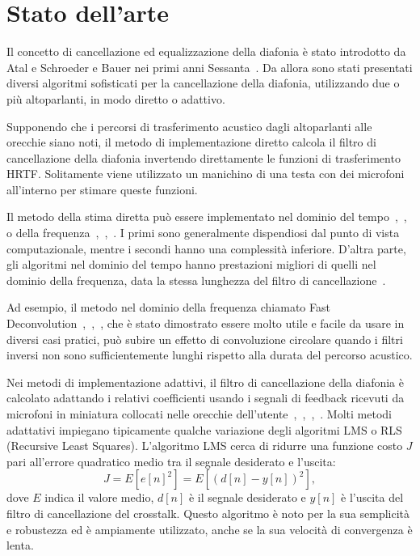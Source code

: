 \documentclass[12pt,a4paper,titlepage]{article}
\begin{document}
\section{Stato dell'arte}
\label{sec:Stato_arte}    
Il concetto di cancellazione ed equalizzazione della diafonia è stato introdotto da Atal e Schroeder e Bauer nei primi anni Sessanta~\cite{Li:comprehensive_comparison}. Da allora sono stati presentati diversi algoritmi sofisticati per la cancellazione della diafonia, utilizzando due o più altoparlanti, in modo diretto o adattivo. 


Supponendo che i percorsi di trasferimento acustico dagli altoparlanti alle orecchie siano noti, il metodo di implementazione diretto calcola il filtro di cancellazione della diafonia invertendo direttamente le funzioni di trasferimento HRTF. Solitamente viene utilizzato un manichino di una testa con dei microfoni all'interno per stimare queste funzioni.

Il metodo della stima diretta può essere implementato nel dominio del tempo~\cite{Gonzalez:time_domain},~\cite{Mouchtaris:Inverse_filter},~\cite{143434} o della frequenza~\cite{kirkeby:deconvolution_regularization},~\cite{kirkeby:deconvolution_analysis},~\cite{kirkeby:deconvolution_design}. I primi sono generalmente dispendiosi dal punto di vista computazionale, mentre i secondi hanno una complessità inferiore. D'altra parte, gli algoritmi nel dominio del tempo hanno prestazioni migliori di quelli nel dominio della frequenza, data la stessa lunghezza del filtro di cancellazione~\cite{wand:a_stereo_crosstalk}.

Ad esempio, il metodo nel dominio della frequenza chiamato Fast Deconvolution~\cite{kirkeby:deconvolution_regularization},~\cite{kirkeby:deconvolution_analysis},~\cite{kirkeby:deconvolution_design}, che è stato dimostrato essere molto utile e facile da usare in diversi casi pratici, può subire un effetto di convoluzione circolare quando i filtri inversi non sono sufficientemente lunghi rispetto alla durata del percorso acustico.

Nei metodi di implementazione adattivi, il filtro di cancellazione della  diafonia è calcolato adattando i relativi coefficienti usando i segnali di feedback ricevuti da microfoni in miniatura collocati nelle orecchie dell'utente~\cite{Ferrara:FLMS},~\cite{4217047},~\cite{143434},~\cite{wand:a_stereo_crosstalk}. Molti metodi adattativi impiegano tipicamente qualche variazione degli algoritmi LMS o RLS (Recursive Least Squares). L'algoritmo LMS cerca di ridurre una funzione costo $J$ pari all'errore quadratico medio tra il segnale desiderato e l'uscita:
\begin{equation*}
J=E[e[n]^2]=E[(d[n]-y[n])^2],
\end{equation*}
dove $E$ indica il valore medio, $d[n]$ è il segnale desiderato e $y[n]$ è l'uscita del filtro di cancellazione del crosstalk. Questo algoritmo è noto per la sua semplicità e robustezza ed è ampiamente utilizzato, anche se la sua velocità di convergenza è lenta. 
\end{document}

